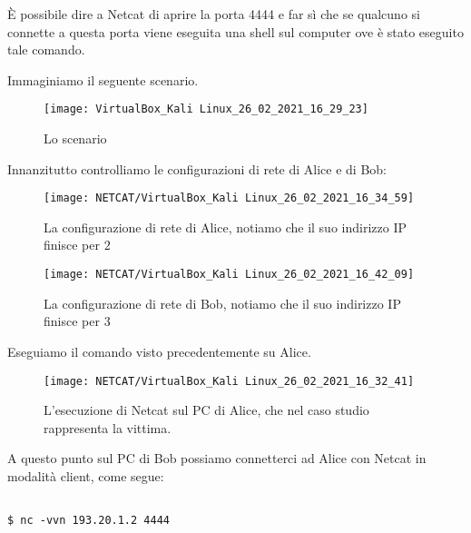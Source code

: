 \documentclass[14pt]{extreport}
\begin{document}
\vspace{5pt}

È possibile dire a Netcat di aprire la porta 4444 e far sì che se qualcuno si connette a questa porta viene eseguita una shell sul computer ove è stato eseguito tale comando.

Immaginiamo il seguente scenario. 


\begin{figure}[H]
    \centering
    \texttt{[image: VirtualBox\_Kali Linux\_26\_02\_2021\_16\_29\_23]}
    \caption{Lo scenario}
\end{figure}




Innanzitutto controlliamo le configurazioni di rete di Alice e di Bob:

\begin{figure}[H]
    \centering
    \texttt{[image: NETCAT/VirtualBox\_Kali Linux\_26\_02\_2021\_16\_34\_59]}
    \caption{La configurazione di rete di Alice, notiamo che il suo indirizzo IP finisce per $2$}
\end{figure}

\begin{figure}[H]
    \centering
    \texttt{[image: NETCAT/VirtualBox\_Kali Linux\_26\_02\_2021\_16\_42\_09]}
    \caption{La configurazione di rete di Bob, notiamo che il suo indirizzo IP finisce per $3$}
\end{figure}







Eseguiamo il comando visto precedentemente su Alice.



\begin{figure}[H]
    \centering
    \texttt{[image: NETCAT/VirtualBox\_Kali Linux\_26\_02\_2021\_16\_32\_41]}
    \caption{L'esecuzione di Netcat sul PC di Alice, che nel caso studio rappresenta la vittima.}
\end{figure}


A questo punto sul PC di Bob possiamo connetterci ad Alice con Netcat in modalità client, come segue:

\vspace{5pt}

{
\small
\begin{tcolorbox}

\begin{verbatim}

$ nc -vvn 193.20.1.2 4444
  
\end{verbatim}

\end{tcolorbox}
}
\end{document}
